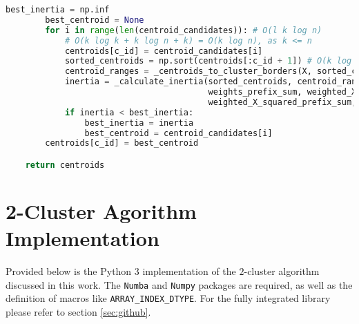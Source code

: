 \begin{lstlisting}[language=Python]
        best_inertia = np.inf
        best_centroid = None
        for i in range(len(centroid_candidates)): # O(l k log n)
            # O(k log k + k log n + k) = O(k log n), as k <= n
            centroids[c_id] = centroid_candidates[i]
            sorted_centroids = np.sort(centroids[:c_id + 1]) # O(k log k), I think we could avoid centroid sorting and use some linear algorithm, but the gain would be minimal, especially considering that k <= n, and most times k << n
            centroid_ranges = _centroids_to_cluster_borders(X, sorted_centroids, start_idx, stop_idx)  # O(k log n)
            inertia = _calculate_inertia(sorted_centroids, centroid_ranges,  # O(k)
                                         weights_prefix_sum, weighted_X_prefix_sum,
                                         weighted_X_squared_prefix_sum, stop_idx)
            if inertia < best_inertia:
                best_inertia = inertia
                best_centroid = centroid_candidates[i]
        centroids[c_id] = best_centroid

    return centroids
\end{lstlisting}

\section{2-Cluster Agorithm Implementation}
\label{sec:2clustercode}

Provided below is the Python 3 implementation of the $2$-cluster algorithm discussed in this work. The \texttt{Numba} and \texttt{Numpy} packages are required, as well as the definition of macros like \texttt{ARRAY\_INDEX\_DTYPE}. For the fully integrated library please refer to section \ref{sec:github}.

